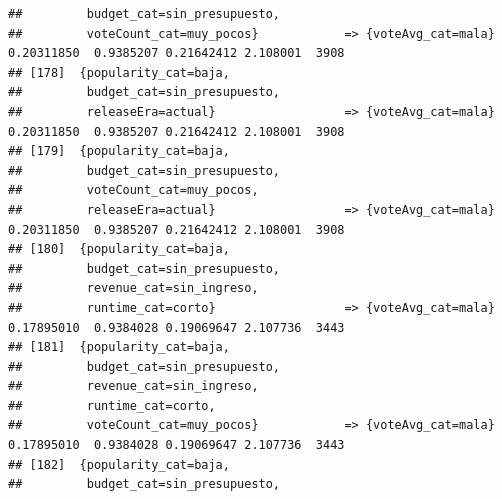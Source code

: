 \documentclass[
]{article}
\begin{document}
\begin{verbatim}
##         budget_cat=sin_presupuesto,                                                                                             
##         voteCount_cat=muy_pocos}            => {voteAvg_cat=mala}                0.20311850  0.9385207 0.21642412 2.108001  3908
## [178]  {popularity_cat=baja,                                                                                                    
##         budget_cat=sin_presupuesto,                                                                                             
##         releaseEra=actual}                  => {voteAvg_cat=mala}                0.20311850  0.9385207 0.21642412 2.108001  3908
## [179]  {popularity_cat=baja,                                                                                                    
##         budget_cat=sin_presupuesto,                                                                                             
##         voteCount_cat=muy_pocos,                                                                                                
##         releaseEra=actual}                  => {voteAvg_cat=mala}                0.20311850  0.9385207 0.21642412 2.108001  3908
## [180]  {popularity_cat=baja,                                                                                                    
##         budget_cat=sin_presupuesto,                                                                                             
##         revenue_cat=sin_ingreso,                                                                                                
##         runtime_cat=corto}                  => {voteAvg_cat=mala}                0.17895010  0.9384028 0.19069647 2.107736  3443
## [181]  {popularity_cat=baja,                                                                                                    
##         budget_cat=sin_presupuesto,                                                                                             
##         revenue_cat=sin_ingreso,                                                                                                
##         runtime_cat=corto,                                                                                                      
##         voteCount_cat=muy_pocos}            => {voteAvg_cat=mala}                0.17895010  0.9384028 0.19069647 2.107736  3443
## [182]  {popularity_cat=baja,                                                                                                    
##         budget_cat=sin_presupuesto,                                                                                             

\end{verbatim}
\end{document}
